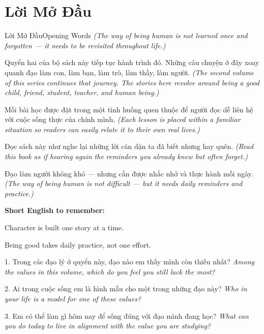 \chapter*{Lời Mở Đầu}

\begin{truyen}{Lời Mở Đầu}{Opening Words}
\textit{(The way of being human is not learned once and forgotten --- it needs to be revisited throughout life.)}

Quyển hai của bộ sách này tiếp tục hành trình đó. Những câu chuyện ở đây xoay quanh đạo làm con, làm bạn, làm trò, làm thầy, làm người.
\textit{(The second volume of this series continues that journey. The stories here revolve around being a good child, friend, student, teacher, and human being.)}

Mỗi bài học được đặt trong một tình huống quen thuộc để người đọc dễ liên hệ với cuộc sống thực của chính mình.
\textit{(Each lesson is placed within a familiar situation so readers can easily relate it to their own real lives.)}

Đọc sách này như nghe lại những lời căn dặn ta đã biết nhưng hay quên.
\textit{(Read this book as if hearing again the reminders you already knew but often forget.)}
\end{truyen}

\begin{baihoc}
Đạo làm người không khó --- nhưng cần được nhắc nhở và thực hành mỗi ngày.
\textit{(The way of being human is not difficult --- but it needs daily reminders and practice.)}
\end{baihoc}

\begin{ghinhoanh}
\textbf{Short English to remember:}

Character is built one story at a time.

Being good takes daily practice, not one effort.
\end{ghinhoanh}

\begin{tuhocnhanh}
1. Trong các đạo lý ở quyển này, đạo nào em thấy mình còn thiếu nhất? \textit{Among the values in this volume, which do you feel you still lack the most?}

2. Ai trong cuộc sống em là hình mẫu cho một trong những đạo này? \textit{Who in your life is a model for one of these values?}

3. Em có thể làm gì hôm nay để sống đúng với đạo mình đang học? \textit{What can you do today to live in alignment with the value you are studying?}
\end{tuhocnhanh}

\ngancach
